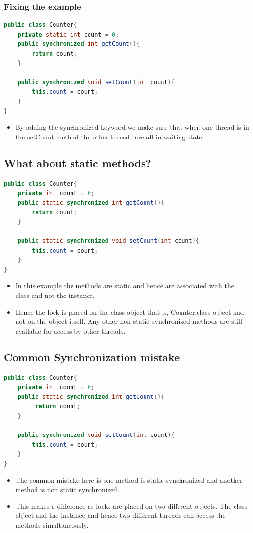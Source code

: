 \documentclass[12pt, a4paper]{book}
\begin{document}
\subsubsection{Fixing the example}
\begin{lstlisting}[language=java]
public class Counter{
	private static int count = 0;
	public synchronized int getCount(){
		return count;
	}

	public synchronized void setCount(int count){
    	this.count = count;
	}
}
\end{lstlisting}
\begin{itemize}
    \item By adding the synchronized keyword we make sure that when one thread is in the setCount method the other threads are all in waiting state.
\end{itemize}
\subsection{What about static methods?}
\begin{lstlisting}[language=java]
public class Counter{
	private int count = 0;
	public static synchronized int getCount(){
	    return count;
	}

	public static synchronized void setCount(int count){
	    this.count = count;
	}
}
\end{lstlisting}
\begin{itemize}
    \item In this example the methods are static and hence are associated with the class and not the instance.
    \item Hence the lock is placed on the class object that is, Counter.class object and not on the object itself.  Any other non static synchronized methods are still available for access by other threads.
\end{itemize}
\subsection{Common Synchronization mistake}
\begin{lstlisting}[language=java]
public class Counter{
	private int count = 0;
	public static synchronized int getCount(){
		 return count;
	}

	public synchronized void setCount(int count){
		this.count = count;
	}
}
\end{lstlisting}
\begin{itemize}
    \item The common mistake here is one method is static synchronized and another method is non static synchronized.
    \item This makes a difference as locks are placed on two different objects. The class object and the instance and hence two different threads can access the methods simultaneously.
\end{itemize}
\end{document}
